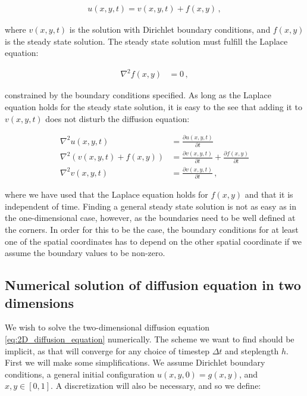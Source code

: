 \documentclass[reprint,english,notitlepage]{revtex4-1}  %
\begin{document}
\begin{align*}
u(x,y,t) = v(x,y,t) + f(x,y) \, ,
\end{align*}

where $v(x,y,t)$ is the solution with Dirichlet boundary conditions, and $f(x,y)$ is the steady state solution. The steady state solution must fulfill the Laplace equation:

\begin{align*}
\nabla^2 f(x,y) &= 0 \, ,
\end{align*}

constrained by the boundary conditions specified. As long as the Laplace equation holds for the steady state solution, it is easy to the see that adding it to $v(x,y,t)$ does not disturb the diffusion equation:

\begin{align*}
\nabla^2 u(x,y,t) &= \frac{\partial u(x,y,t)}{\partial t} \\
\nabla^2 (v(x,y,t) + f(x,y) ) &= \frac{\partial v(x,y,t)}{\partial t} + \frac{\partial f(x,y)}{\partial t} \\
\nabla^2 v(x,y,t) &= \frac{\partial v(x,y,t)}{\partial t} \, ,
\end{align*}

where we have used that the Laplace equation holds for $f(x,y)$ and that it is independent of time. Finding a general steady state solution is not as easy as in the one-dimensional case, however, as the boundaries need to be well defined at the corners. In order for this to be the case, the boundary conditions for at least one of the spatial coordinates has to depend on the other spatial coordinate if we assume the boundary values to be non-zero. 





\subsection{Numerical solution of diffusion equation in two dimensions} \label{sec:formalism_2D_diff_eq_numerical}

We wish to solve the two-dimensional diffusion equation \eqref{eq:2D_diffusion_equation} numerically. The scheme we want to find should be implicit, as that will converge for any choice of timestep $\Delta t$ and steplength $h$. First we will make some simplifications. We assume Dirichlet boundary conditions, a general initial configuration $u(x,y,0) = g(x,y)$, and $x,y\in[0,1]$. A discretization will also be necessary, and so we define:
\end{document}
